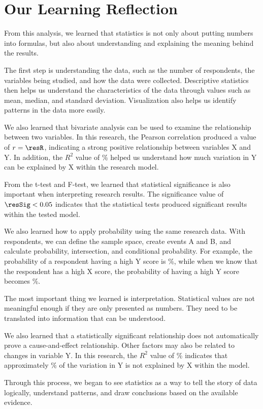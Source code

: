 \section{Our Learning Reflection}

From this analysis, we learned that statistics is not only about putting
numbers into formulas, but also about understanding and explaining the
meaning behind the results.

The first step is understanding the data, such as the number of
respondents, the variables being studied, and how the data were collected.
Descriptive statistics then helps us understand the characteristics of the
data through values such as mean, median, and standard deviation.
Visualization also helps us identify patterns in the data more easily.

We also learned that bivariate analysis can be used to examine the
relationship between two variables. In this research, the Pearson
correlation produced a value of $r = \resR$, indicating a strong positive
relationship between variables X and Y. In addition, the $R^2$ value of
\resRSquaredPct\% helped us understand how much variation in Y can be
explained by X within the research model.

From the t-test and F-test, we learned that statistical significance is
also important when interpreting research results. The significance value
of $\resSig < 0.05$ indicates that the statistical tests produced
significant results within the tested model.

We also learned how to apply probability using the same research data.
With \resN{} respondents, we can define the sample space, create events A and
B, and calculate probability, intersection, and conditional probability.
For example, the probability of a respondent having a high Y score is
\resPB\%, while when we know that the respondent has a high X score, the
probability of having a high Y score becomes \resPBGivenA\%.

The most important thing we learned is interpretation. Statistical values
are not meaningful enough if they are only presented as numbers. They need
to be translated into information that can be understood.

We also learned that a statistically significant relationship does not
automatically prove a cause-and-effect relationship. Other factors may
also be related to changes in variable Y. In this research, the $R^2$
value of \resRSquaredPct\% indicates that approximately
\resUnexplainedPct\% of the variation in Y is not explained by X within
the model.

Through this process, we began to see statistics as a way to tell the
story of data logically, understand patterns, and draw conclusions based
on the available evidence.
